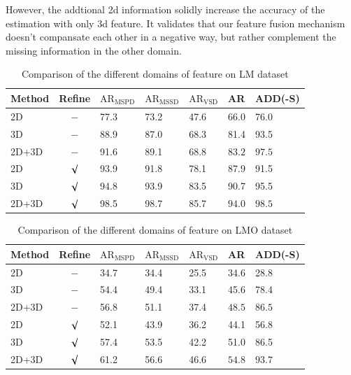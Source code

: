 \documentclass[12pt,DIV14,BCOR12mm,a4paper,footinclude=false,headinclude,parskip=half-,twoside,openright,cleardoublepage=empty,toc=index,bibliography=totoc,listof=totoc]{scrreprt}
\numberwithin{equation}{chapter}
\begin{document}
However, the addtional \gls{2d} information solidly increase the accuracy of the estimation with only \gls{3d} feature. It validates that our feature fusion mechanism doesn't compansate each other in a negative way, but rather complement the missing information in the other domain.
\begin{table}[h]
  \centering
  \caption{Comparison of the different domains of feature on LM dataset}
  \label{tab:ab_feat_lm}
  \begin{tabular}{l | c | C{16mm} C{16mm} C{16mm}| C{16mm}| C{16mm}}
      \toprule
      Method & Refine & $\text{AR}_{\text{MSPD}}$ & $\text{AR}_{\text{MSSD}}$ & $\text{AR}_{\text{VSD}}$ & AR & ADD(-S) \\
      \midrule
      2D  & $-$ & 77.3 & 73.2 & 47.6 & 66.0 & 76.0 \\
      3D & $-$ & 88.9 & 87.0 & 68.3 & 81.4 & 93.5 \\
      2D+3D  & $-$ & 91.6 & 89.1 & 68.8 & $\mathbf{83.2}$ & $\mathbf{97.5}$ \\
      2D  & $\surd$ & 93.9 & 91.8 & 78.1 & 87.9 & 91.5 \\
      3D & $\surd$ & 94.8 & 93.9 & 83.5 & 90.7 & 95.5 \\
      2D+3D  & $\surd$ & 98.5 & 98.7 & 85.7 & $\mathbf{94.0}$ & $\mathbf{98.5}$ \\
      \bottomrule
  \end{tabular}
\end{table}
\begin{table}[h]
  \centering
  \caption{Comparison of the different domains of feature on LMO dataset}
  \label{tab:ab_feat_lmo}
  \begin{tabular}{l | c | C{16mm} C{16mm} C{16mm}| C{16mm}| C{16mm}}
      \toprule
      Method & Refine & $\text{AR}_{\text{MSPD}}$ & $\text{AR}_{\text{MSSD}}$ & $\text{AR}_{\text{VSD}}$ & AR & ADD(-S) \\
      \midrule
      2D  & $-$ & 34.7 & 34.4 & 25.5 & 34.6 & 28.8 \\
      3D & $-$ & 54.4 & 49.4 & 33.1 & 45.6 & 78.4 \\
      2D+3D  & $-$ & 56.8 & 51.1 & 37.4 & $\mathbf{48.5}$ & $\mathbf{86.5}$ \\
      2D  & $\surd$ & 52.1 & 43.9 & 36.2 & 44.1 & 56.8 \\
      3D & $\surd$ & 57.4 & 53.5 & 42.2 & 51.0 & 86.5 \\
      2D+3D  & $\surd$ & 61.2 & 56.6 & 46.6 & $\mathbf{54.8}$ & $\mathbf{93.7}$ \\
      \bottomrule
  \end{tabular}
\end{table}
\end{document}
